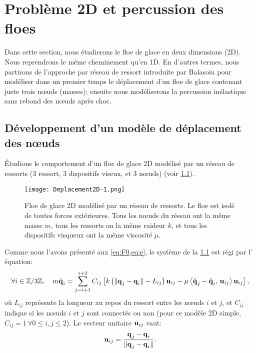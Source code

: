 
\chapter{Problème 2D et percussion des floes} %

\label{Chapter4} %




Dans cette section, nous étudierons le floe de glace en deux dimensions (2D). Nous reprendrons le même cheminement qu'en 1D. En d'autres termes, nous partirons de l'approche par réseau de ressort introduite par Balasoiu pour modéliser dans un premier temps le déplacement d'un floe de glace contenant juste trois n\oe{}uds (masses); ensuite nous modéliserons la percussion inélastique sans rebond des n\oe{}uds après choc.







\section{Développement d'un modèle de déplacement des n\oe{}uds}








Étudions le comportement d'un floe de glace 2D modélisé par un réseau de ressorts (3 ressort, 3 dispositifs viseux, et 3 n\oe{}uds) (voir \cref{fig:deplacement2d}).
\begin{figure}[!h]
    \centering
    \texttt{[image: Deplacement2D-1.png]}
    \caption{Floe de glace 2D modélisé par un réseau de ressorts. Le floe est isolé de toutes forces extérieures. Tous les n\oe{}uds du réseau ont la même masse $m$, tous les ressorts on la même raideur $k$, et tous les dispositifs visqueux ont la même viscosité $\mu$.}
    \label{fig:deplacement2d}
\end{figure}


\noindent Comme nous l'avons présenté aux \cref{eq:F0,eq:e}, le système de la \cref{fig:deplacement2d} est régi par l' équation:
\begin{align} \label{eq:eprime2}
    \forall i \in \mathbb{Z}/3\mathbb{Z}, \quad m \ddot{\bm{\mathrm{q}}}_i = \sum_{j=i+1}^{i+2}C_{ij} \left[  k \left( \Vert \bm{\mathrm{q}}_j - \bm{\mathrm{q}}_i \Vert - L_{ij} \right) \bm{\mathrm{u}}_{ij} - \mu \left\langle \bm{\mathrm{\dot{q}}}_j - \bm{\mathrm{\dot{q}}}_i, \, \bm{\mathrm{u}}_{ij}  \right\rangle  \bm{\mathrm{u}}_{ij}  \right]  , 
\end{align}
où $L_{ij}$ représente la longueur au repos du ressort entre les n\oe{}uds $i$ et $j$, et $C_{ij}$ indique si les n\oe{}uds $i$ et $j$ sont connectés ou non (pour ce modèle 2D simple, $C_{ij} = 1 \, \forall 0 \leq i,j \leq 2$). Le vecteur unitaire $\bm{\mathrm{u}}_{ij}$ vaut:
$$
\bm{\mathrm{u}}_{ij} = \frac{\bm{\mathrm{q}}_j - \bm{\mathrm{q}}_i}{\Vert \bm{\mathrm{q}}_j - \bm{\mathrm{q}}_i \Vert}.
$$


